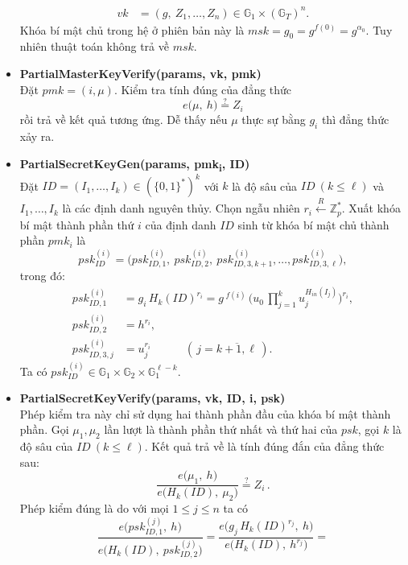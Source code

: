 \documentclass[class=report, crop=false]{standalone}
\begin{document}
\begin{itemize}[leftmargin=1cm, itemindent=-1cm]
\begin{align*}
				vk &= (g,\ Z_1, \dots, Z_n) \in \mathbb{G}_1 \times (\mathbb{G}_T)^n.
			\end{align*}
			Khóa bí mật chủ trong hệ ở phiên bản này là $msk = g_0 = g^{f(0)} = g^{\alpha_0}$. Tuy nhiên thuật toán không trả về $msk$.
			\item[] {\sffamily\bfseries PartialMasterKeyVerify(params, vk, pmk)} \\
			Đặt $pmk = (i, \mu)$. Kiểm tra tính đúng của đẳng thức
			\[
				e \Big(\mu,\ h \Big) \overset{?}{=} Z_i
			\]
			rồi trả về kết quả tương ứng. Dễ thấy nếu $\mu$ thực sự bằng $g_i$ thì đẳng thức xảy ra.
			\item[] {\sffamily\bfseries PartialSecretKeyGen(params, pmk\textsubscript{i}, ID)} \\
			Đặt $ID = (I_1, \dots, I_k) \in (\{0, 1 \}^*)^k$ với $k$ là độ sâu của $ID \ (k \leq \ell)$ và $I_1, \dots, I_k$ là các định danh nguyên thủy. Chọn ngẫu nhiên $r_i \xleftarrow{R} \mathbb{Z}_p^*$. Xuất khóa bí mật thành phần thứ $i$ của định danh $ID$ sinh từ khóa bí mật chủ thành phần $pmk_i$ là
			\[
				psk_{ID}^{(i)} = \Big(psk_{ID, 1}^{(i)},\ psk_{ID, 2}^{(i)},\ psk_{ID, 3, k + 1}^{(i)}, \dots, psk_{ID, 3, \ell}^{(i)} \Big),
			\]
			trong đó:
			\vspace{-\baselineskip}
			\begin{align*}
				psk_{ID, 1}^{(i)} &= g_i\, H_{k}(ID)^{r_i} = g\,^{f(i)}\, \Big(u_0 \, \prod_{j = 1}^k u_j^{H_{in}(I_j)} \Big)^{r_i}, \\
				psk_{ID, 2}^{(i)} &= h^{r_i}, \\
				psk_{ID, 3, j}^{(i)} &= u_j^{r_i} \quad\quad\quad (\, j = \overline{k + 1, \ell}\,).
			\end{align*}
			Ta có $psk_{ID}^{(i)} \in \mathbb{G}_1 \times \mathbb{G}_2 \times \mathbb{G}_1^{\ell - k}$.
			\item[] {\sffamily\bfseries PartialSecretKeyVerify(params, vk, ID, i, psk)} \\
			Phép kiểm tra này chỉ sử dụng hai thành phần đầu của khóa bí mật thành phần. Gọi $\mu_1, \mu_2$ lần lượt là thành phần thứ nhất và thứ hai của $psk$, gọi $k$ là độ sâu của $ID \ (k \leq \ell)$. Kết quả trả về là tính đúng đắn của đẳng thức sau:
			\[
				\frac{e \Big(\mu_1,\ h \Big)}{e \Big(H_{k}(ID),\ \mu_2 \Big)} \overset{?}{=} Z_i \,.
			\]
			Phép kiểm đúng là do với mọi $1 \leq j \leq n$ ta có
			\[
				\frac{e \Big(psk_{ID, 1}^{(j)},\ h \Big)}{e \Big(H_{k}(ID),\ psk_{ID, 2}^{(j)} \Big)} =
				\frac{e \Big(g_j\, H_{k}(ID)^{r_j},\ h \Big)}{e \Big(H_{k}(ID),\ h^{r_j} \Big)} =
\]
\end{itemize}
\end{document}
